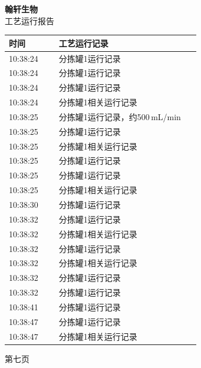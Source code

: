\documentclass[UTF8,10pt,a4paper,fontset=fandol]{ctexart}
\begin{document}
\noindent
\begin{minipage}[t]{0.47\linewidth}
\centering
\textbf{翰轩生物}\\[-1mm]
工艺运行报告

\vspace{2mm}
\scriptsize
\begin{tabular}{|p{0.24\linewidth}|p{0.68\linewidth}|}
\hline
时间 & 工艺运行记录 \\ \hline
10:38:24 & 分拣罐1运行记录 \\ \hline
10:38:24 & 分拣罐1运行记录 \\ \hline
10:38:24 & 分拣罐1运行记录 \\ \hline
10:38:24 & 分拣罐1相关运行记录 \\ \hline
10:38:25 & 分拣罐1运行记录，约500\,mL/min \\ \hline
10:38:25 & 分拣罐1运行记录 \\ \hline
10:38:25 & 分拣罐1相关运行记录 \\ \hline
10:38:25 & 分拣罐1运行记录 \\ \hline
10:38:25 & 分拣罐1运行记录 \\ \hline
10:38:25 & 分拣罐1相关运行记录 \\ \hline
10:38:30 & 分拣罐1运行记录 \\ \hline
10:38:32 & 分拣罐1运行记录 \\ \hline
10:38:32 & 分拣罐1相关运行记录 \\ \hline
10:38:32 & 分拣罐1运行记录 \\ \hline
10:38:32 & 分拣罐1相关运行记录 \\ \hline
10:38:32 & 分拣罐1运行记录 \\ \hline
10:38:32 & 分拣罐1运行记录 \\ \hline
10:38:41 & 分拣罐1运行记录 \\ \hline
10:38:47 & 分拣罐1运行记录 \\ \hline
10:38:47 & 分拣罐1相关运行记录 \\ \hline
\end{tabular}

\vspace{1mm}

第七页
\end{minipage}
\hfill
\end{document}
